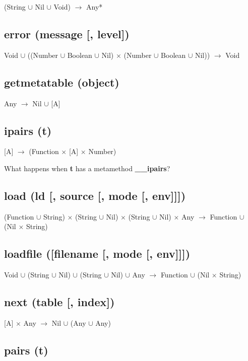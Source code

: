 \documentclass[12pt]{article}
\begin{document}
(String $\cup$ Nil $\cup$ Void) $\rightarrow$ Any*

\subsection{error (message [, level])}

Void $\cup$
((Number $\cup$ Boolean $\cup$ Nil) $\times$
(Number $\cup$ Boolean $\cup$ Nil)) $\rightarrow$
Void

\subsection{getmetatable (object)}

Any $\rightarrow$ Nil $\cup$ [A]

\subsection{ipairs (t)}

[A] $\rightarrow$ (Function $\times$ [A] $\times$ Number)

What happens when \textbf{t} has a metamethod \textbf{\_\_ipairs}?

\subsection{load (ld [, source [, mode [, env]]])}

(Function $\cup$ String) $\times$
(String $\cup$ Nil) $\times$
(String $\cup$ Nil) $\times$
Any $\rightarrow$
Function $\cup$ (Nil $\times$ String)

\subsection{loadfile ([filename [, mode [, env]]])}

Void $\cup$
(String $\cup$ Nil) $\cup$
(String $\cup$ Nil) $\cup$
Any $\rightarrow$
Function $\cup$ (Nil $\times$ String)

\subsection{next (table [, index])}

[A] $\times$ Any $\rightarrow$
Nil $\cup$ (Any $\cup$ Any)

\subsection{pairs (t)}
\end{document}
